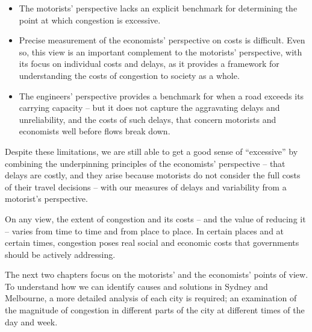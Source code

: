 \documentclass{grattan}
\begin{document}
\begin{itemize}
\item The motorists’ perspective lacks an explicit benchmark for determining the point at which congestion is excessive.
\item Precise measurement of the economists' perspective on costs is difficult. Even so, this view is an important complement to the motorists' perspective, with its focus on individual costs and delays, as it provides a framework for understanding the costs of congestion to society as a whole. 
\item The engineers' perspective provides a benchmark for when a road exceeds its carrying capacity -- but it does not capture the aggravating delays and unreliability, and the costs of such delays, that concern motorists and economists well before flows break down.
\end{itemize}

Despite these limitations, we are still able to get a good sense of ``excessive'' by combining the underpinning principles of the economists’ perspective -- that delays are costly, and they arise because motorists do not consider the full costs of their travel decisions -- with our measures of delays and variability from a motorist's perspective.

On any view, the extent of congestion and its costs -- and the value of reducing it -- varies from time to time and from place to place. In certain places and at certain times, congestion poses real social and economic costs that governments should be actively addressing.

The next two chapters focus on the motorists' and the economists' points of view.
To understand how we can identify causes and solutions in Sydney and Melbourne, a more detailed analysis of each city is required; an examination of the magnitude of congestion in different parts of the city at different times of the day and week.
\end{document}
